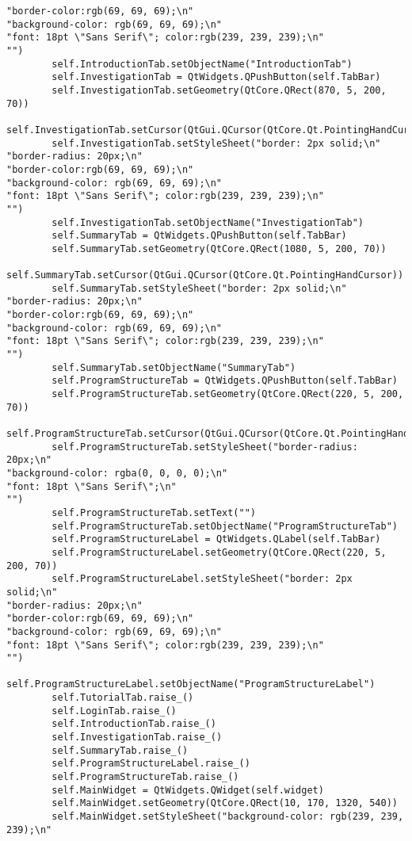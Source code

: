 \documentclass{article}
\begin{document}
\begin{lstlisting}
"border-color:rgb(69, 69, 69);\n"
"background-color: rgb(69, 69, 69);\n"
"font: 18pt \"Sans Serif\"; color:rgb(239, 239, 239);\n"
"")
        self.IntroductionTab.setObjectName("IntroductionTab")
        self.InvestigationTab = QtWidgets.QPushButton(self.TabBar)
        self.InvestigationTab.setGeometry(QtCore.QRect(870, 5, 200, 70))
        self.InvestigationTab.setCursor(QtGui.QCursor(QtCore.Qt.PointingHandCursor))
        self.InvestigationTab.setStyleSheet("border: 2px solid;\n"
"border-radius: 20px;\n"
"border-color:rgb(69, 69, 69);\n"
"background-color: rgb(69, 69, 69);\n"
"font: 18pt \"Sans Serif\"; color:rgb(239, 239, 239);\n"
"")
        self.InvestigationTab.setObjectName("InvestigationTab")
        self.SummaryTab = QtWidgets.QPushButton(self.TabBar)
        self.SummaryTab.setGeometry(QtCore.QRect(1080, 5, 200, 70))
        self.SummaryTab.setCursor(QtGui.QCursor(QtCore.Qt.PointingHandCursor))
        self.SummaryTab.setStyleSheet("border: 2px solid;\n"
"border-radius: 20px;\n"
"border-color:rgb(69, 69, 69);\n"
"background-color: rgb(69, 69, 69);\n"
"font: 18pt \"Sans Serif\"; color:rgb(239, 239, 239);\n"
"")
        self.SummaryTab.setObjectName("SummaryTab")
        self.ProgramStructureTab = QtWidgets.QPushButton(self.TabBar)
        self.ProgramStructureTab.setGeometry(QtCore.QRect(220, 5, 200, 70))
        self.ProgramStructureTab.setCursor(QtGui.QCursor(QtCore.Qt.PointingHandCursor))
        self.ProgramStructureTab.setStyleSheet("border-radius: 20px;\n"
"background-color: rgba(0, 0, 0, 0);\n"
"font: 18pt \"Sans Serif\";\n"
"")
        self.ProgramStructureTab.setText("")
        self.ProgramStructureTab.setObjectName("ProgramStructureTab")
        self.ProgramStructureLabel = QtWidgets.QLabel(self.TabBar)
        self.ProgramStructureLabel.setGeometry(QtCore.QRect(220, 5, 200, 70))
        self.ProgramStructureLabel.setStyleSheet("border: 2px solid;\n"
"border-radius: 20px;\n"
"border-color:rgb(69, 69, 69);\n"
"background-color: rgb(69, 69, 69);\n"
"font: 18pt \"Sans Serif\"; color:rgb(239, 239, 239);\n"
"")
        self.ProgramStructureLabel.setObjectName("ProgramStructureLabel")
        self.TutorialTab.raise_()
        self.LoginTab.raise_()
        self.IntroductionTab.raise_()
        self.InvestigationTab.raise_()
        self.SummaryTab.raise_()
        self.ProgramStructureLabel.raise_()
        self.ProgramStructureTab.raise_()
        self.MainWidget = QtWidgets.QWidget(self.widget)
        self.MainWidget.setGeometry(QtCore.QRect(10, 170, 1320, 540))
        self.MainWidget.setStyleSheet("background-color: rgb(239, 239, 239);\n"

\end{lstlisting}
\end{document}
